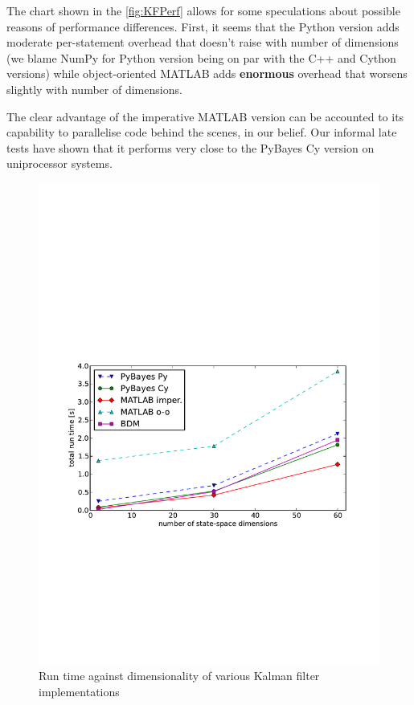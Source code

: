 The chart shown in the \autoref{fig:KFPerf} allows for some speculations about possible reasons
of performance differences. First, it seems that the Python version adds moderate per-statement
overhead that doesn't raise with number of dimensions (we blame NumPy for Python version being
on par with the C++ and Cython versions) while object-oriented MATLAB adds \textbf{enormous} overhead
that worsens slightly with number of dimensions.

The clear advantage of the imperative MATLAB version can be accounted to its capability to parallelise
code behind the scenes, in our belief. Our informal late tests have shown that it performs very
close to the PyBayes Cy version on uniprocessor systems.

\begin{figure}[h]
	\centering
	\includegraphics[width=14cm,keepaspectratio=true,clip=true,trim=19mm 85mm 20mm 111mm]{./KFPerf.pdf}
	\caption{Run time against dimensionality of various Kalman filter implementations}
	\label{fig:KFPerf}
\end{figure}
